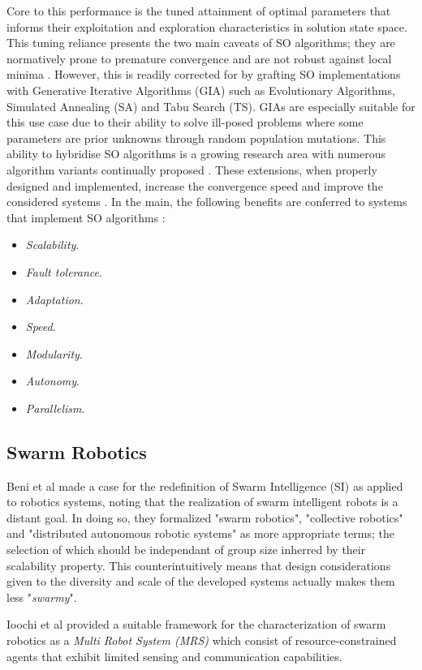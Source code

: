\documentclass{report}
\begin{document}
Core to this performance is the tuned attainment of optimal parameters that informs their exploitation and exploration characteristics in solution state space. This tuning reliance presents the two main caveats of SO algorithms; they are normatively prone to premature convergence and are not robust against local minima \cite{Cuevas2013}. However, this is readily corrected for by grafting SO implementations with Generative Iterative Algorithms (GIA) such as Evolutionary Algorithms, Simulated Annealing (SA) and Tabu Search (TS). GIAs are especially suitable for this use case due to their ability to solve ill-posed problems where some parameters are prior unknowns \cite{Youssef2001} through random population mutations. This ability to hybridise SO algorithms is a growing research area with numerous algorithm variants continually proposed \cite{Tran2016} \cite{Coello2006} \cite{Phung2017}. These extensions, when properly designed and implemented, increase the convergence speed and improve the considered systems \cite{Tran2016}. In the main, the following benefits are conferred to systems that implement SO algorithms \cite{Cuevas2013}:
\begin{itemize}
	\item \textit{Scalability}.
	\item \textit{Fault tolerance}.
	\item \textit{Adaptation}.
	\item \textit{Speed}.
	\item \textit{Modularity}.
	\item \textit{Autonomy}.
	\item \textit{Parallelism}.
\end{itemize}

\subsection{Swarm Robotics}
Beni et al \cite{Beni2005a} made a case for the redefinition of Swarm Intelligence (SI) as applied to robotics systems, noting that the realization of swarm intelligent robots is a distant goal. In doing so, they formalized "swarm robotics", "collective robotics" and "distributed autonomous robotic systems" as more appropriate terms; the selection of which should be independant of group size inherred by their scalability property. This counterintuitively means that design considerations given to the diversity and scale of the developed systems actually makes them less "\textit{swarmy}".

Ioochi et al \cite{Iocchi2001} provided a suitable framework for the characterization of swarm robotics as a \textit{Multi Robot System (MRS)} which consist of resource-constrained agents that exhibit limited sensing and communication capabilities.
\end{document}
